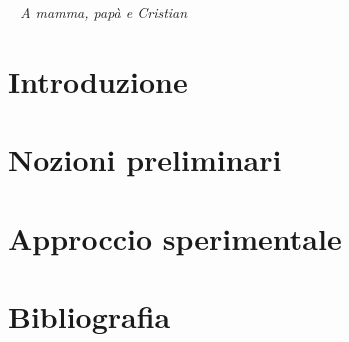 \documentclass[a4paper,12pt]{book}
\begin{document}

\thispagestyle{empty} %
\cleardoublepage

\clearpage{\pagestyle{plain}\cleardoublepage}
\vspace*{\fill}
\begin{flushright}
\textit{~ A mamma, papà e Cristian ~}
\end{flushright}
\vspace*{\fill}

\thispagestyle{empty}

\clearpage{\pagestyle{plain}\cleardoublepage}
\tableofcontents %

\clearpage{\pagestyle{plain}\cleardoublepage} %

\clearpage{\pagestyle{plain}\cleardoublepage} %
\chapter*{Introduzione} %
\label{chapter:zero} %

\clearpage{\pagestyle{plain}\cleardoublepage} %
\chapter{Nozioni preliminari} %
\label{chapter:primo} %

\clearpage{\pagestyle{plain}\cleardoublepage} %
\chapter{Approccio sperimentale} %
\label{chapter:secondo} %

\pagestyle{plain}
\cleardoublepage
\chapter*{Bibliografia} %
\printbibliography[heading=none]
\end{document}
